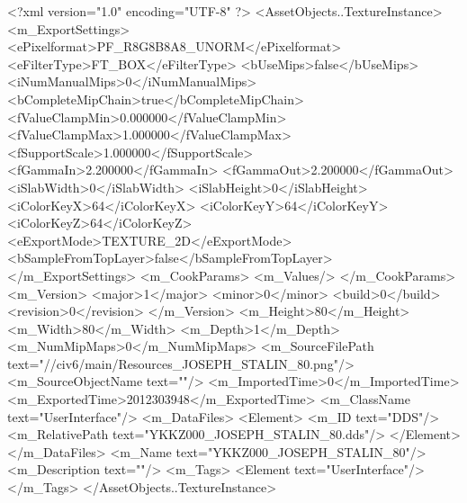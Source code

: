 <?xml version="1.0" encoding="UTF-8" ?>
<AssetObjects..TextureInstance>
	<m_ExportSettings>
		<ePixelformat>PF_R8G8B8A8_UNORM</ePixelformat>
		<eFilterType>FT_BOX</eFilterType>
		<bUseMips>false</bUseMips>
		<iNumManualMips>0</iNumManualMips>
		<bCompleteMipChain>true</bCompleteMipChain>
		<fValueClampMin>0.000000</fValueClampMin>
		<fValueClampMax>1.000000</fValueClampMax>
		<fSupportScale>1.000000</fSupportScale>
		<fGammaIn>2.200000</fGammaIn>
		<fGammaOut>2.200000</fGammaOut>
		<iSlabWidth>0</iSlabWidth>
		<iSlabHeight>0</iSlabHeight>
		<iColorKeyX>64</iColorKeyX>
		<iColorKeyY>64</iColorKeyY>
		<iColorKeyZ>64</iColorKeyZ>
		<eExportMode>TEXTURE_2D</eExportMode>
		<bSampleFromTopLayer>false</bSampleFromTopLayer>
	</m_ExportSettings>
	<m_CookParams>
		<m_Values/>
	</m_CookParams>
	<m_Version>
		<major>1</major>
		<minor>0</minor>
		<build>0</build>
		<revision>0</revision>
	</m_Version>
	<m_Height>80</m_Height>
	<m_Width>80</m_Width>
	<m_Depth>1</m_Depth>
	<m_NumMipMaps>0</m_NumMipMaps>
	<m_SourceFilePath text="//civ6/main/Resources_JOSEPH_STALIN_80.png"/>
	<m_SourceObjectName text=""/>
	<m_ImportedTime>0</m_ImportedTime>
	<m_ExportedTime>2012303948</m_ExportedTime>
	<m_ClassName text="UserInterface"/>
	<m_DataFiles>
		<Element>
			<m_ID text="DDS"/>
			<m_RelativePath text="YKKZ000_JOSEPH_STALIN_80.dds"/>
		</Element>
	</m_DataFiles>
	<m_Name text="YKKZ000_JOSEPH_STALIN_80"/>
	<m_Description text=""/>
	<m_Tags>
		<Element text="UserInterface"/>
	</m_Tags>
</AssetObjects..TextureInstance>

